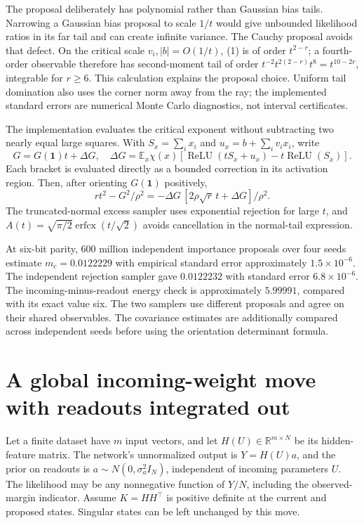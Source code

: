 \documentclass[11pt]{article}
\newcommand{\E}{\mathbb E}\newcommand{\R}{\mathbb R}\newcommand{\relu}{\operatorname{ReLU}}
\begin{document}
The proposal deliberately has polynomial rather than Gaussian bias tails.
Narrowing a Gaussian bias proposal to scale $1/t$ would give unbounded
likelihood ratios in its far tail and can create infinite variance.
The Cauchy proposal avoids that defect. On the critical scale
$v_i,|b|=O(1/t)$, (1) is of order $t^{2-r}$; a fourth-order observable
therefore has second-moment tail of order
$t^{-2}t^{2(2-r)}t^8=t^{10-2r}$, integrable for $r\ge6$.
This calculation explains the proposal choice. Uniform tail domination
also uses the corner norm away from the ray; the implemented standard
errors are numerical Monte Carlo diagnostics, not interval certificates.

The implementation evaluates the critical exponent without subtracting
two nearly equal large squares. With $S_x=\sum_i x_i$ and
$u_x=b+\sum_i v_ix_i$, write
\[
 G=G(\boldsymbol1)t+\Delta G,\quad
 \Delta G=\E_x\chi(x)
 [\relu(tS_x+u_x)-t\relu(S_x)].
\]
Each bracket is evaluated directly as a bounded correction in its
activation region. Then, after orienting $G(\boldsymbol1)$ positively,
\[
 rt^2-G^2/\rho^2=-\Delta G\,[2\rho\sqrt r\,t+\Delta G]/\rho^2.
\]
The truncated-normal excess sampler uses exponential rejection for large
$t$, and $A(t)=\sqrt{\pi/2}\operatorname{erfcx}(t/\sqrt2)$ avoids
cancellation in the normal-tail expression.

At six-bit parity, 600 million independent importance proposals over four
seeds estimate $m_c=0.0122229$ with empirical standard error approximately
$1.5\times10^{-6}$. The independent rejection sampler gave $0.0122232$
with standard error $6.8\times10^{-6}$. The incoming-minus-readout energy
check is approximately $5.99991$, compared with its exact value six.
The two samplers use different proposals and agree on their shared
observables. The covariance estimates are additionally compared across
independent seeds before using the orientation determinant formula.

\section{A global incoming-weight move with readouts integrated out}
Let a finite dataset have $m$ input vectors, and let $H(U)\in\R^{m\times N}$
be its hidden-feature matrix. The network's unnormalized output is
$Y=H(U)a$, and the prior on readouts is $a\sim N(0,\sigma_a^2I_N)$,
independent of incoming parameters $U$. The likelihood may be any
nonnegative function of $Y/N$, including the observed-margin indicator.
Assume $K=HH^\top$ is positive definite at the current and proposed
states. Singular states can be left unchanged by this move.
\end{document}
